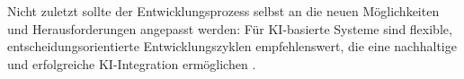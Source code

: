 Nicht zuletzt sollte der Entwicklungsprozess selbst an die neuen Möglichkeiten
und Herausforderungen angepasst werden: Für KI-basierte Systeme sind flexible,
entscheidungsorientierte Entwicklungszyklen empfehlenswert, die eine
nachhaltige und erfolgreiche KI-Integration ermöglichen \cite{gill_agile_2025}.


